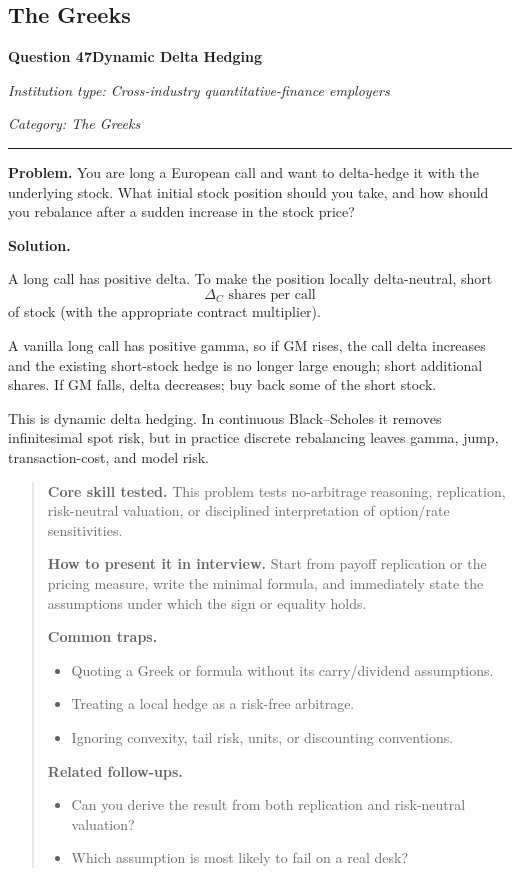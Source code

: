 \documentclass[11pt,letterpaper,openany]{book}
\newenvironment{EditorialNote}
  {\begin{quote}\small\setlength{\parskip}{0.25em}}
  {\end{quote}}
\newcommand{\QuestionSpacer}{\vspace{0.4em}}
\newcommand{\FoundationQuestionHeader}[3]{%
  \vspace{1.0em}%
  {\large\bfseries #1\enspace #2\par}%
  {\small\itshape Institution type: Cross-industry quantitative-finance employers\par}%
  {\small\itshape Category: #3\par}%
  \vspace{0.25em}\hrule\vspace{0.45em}%
}
\begin{document}
\subsection{The Greeks}

\FoundationQuestionHeader{Question 47}{Dynamic Delta Hedging}{The Greeks}

\textbf{Problem.} You are long a European call and want to delta-hedge it with the underlying stock. What initial stock position should you take, and how should you rebalance after a sudden increase in the stock price?


\textbf{Solution.}

A long call has positive delta. To make the position locally delta-neutral, short
\[
\boxed{\Delta_C\text{ shares per call}}
\]
of stock (with the appropriate contract multiplier).

A vanilla long call has positive gamma, so if GM rises, the call delta increases and the existing short-stock hedge is no longer large enough; short additional shares. If GM falls, delta decreases; buy back some of the short stock.

This is dynamic delta hedging. In continuous Black--Scholes it removes infinitesimal spot risk, but in practice discrete rebalancing leaves gamma, jump, transaction-cost, and model risk.


\begin{EditorialNote}


\textbf{Core skill tested.} This problem tests no-arbitrage reasoning, replication, risk-neutral valuation, or disciplined interpretation of option/rate sensitivities.


\textbf{How to present it in interview.} Start from payoff replication or the pricing measure, write the minimal formula, and immediately state the assumptions under which the sign or equality holds.


\textbf{Common traps.}
\begin{itemize}
\item Quoting a Greek or formula without its carry/dividend assumptions.
\item Treating a local hedge as a risk-free arbitrage.
\item Ignoring convexity, tail risk, units, or discounting conventions.
\end{itemize}


\textbf{Related follow-ups.}
\begin{itemize}
\item Can you derive the result from both replication and risk-neutral valuation?
\item Which assumption is most likely to fail on a real desk?
\end{itemize}


\end{EditorialNote}
\QuestionSpacer
\end{document}

